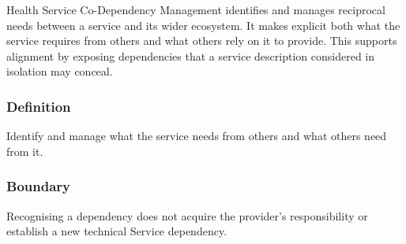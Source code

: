 Health Service Co-Dependency Management identifies and manages reciprocal needs between a service and its wider ecosystem. It makes explicit both what the service requires from others and what others rely on it to provide. This supports alignment by exposing dependencies that a service description considered in isolation may conceal.

\subsubsection*{Definition}

Identify and manage what the service needs from others and what others need from it.

\subsubsection*{Boundary}

Recognising a dependency does not acquire the provider's responsibility or establish a new technical Service dependency.

